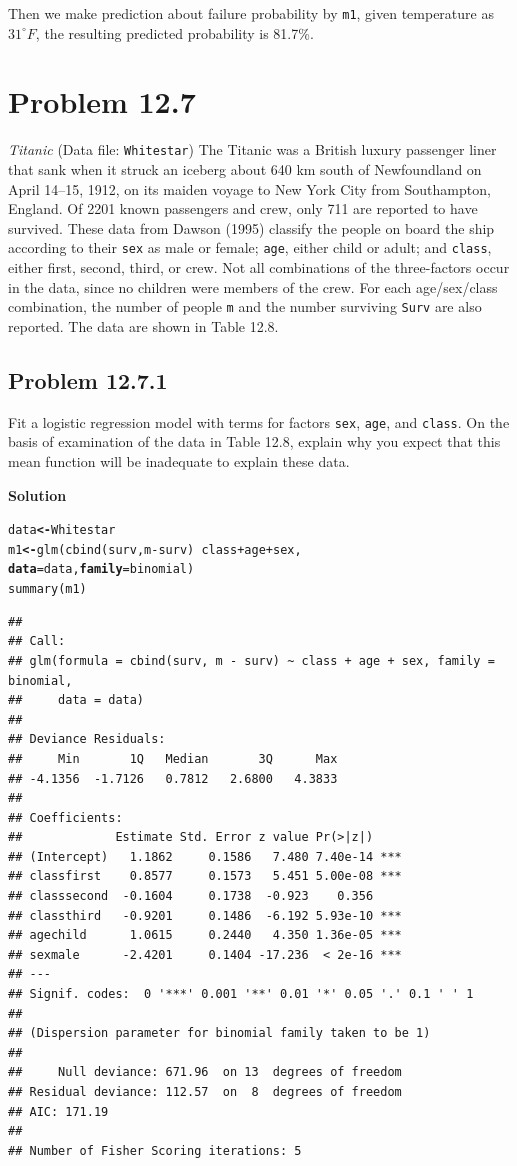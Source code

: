 \documentclass[12pt,oneside,a4paper]{article}\usepackage[]{graphicx}\usepackage[]{xcolor}
\makeatletter
\newcommand{\hlopt}[1]{\textcolor[rgb]{0,0,0}{#1}}%
\newcommand{\hlstd}[1]{\textcolor[rgb]{0,0,0}{#1}}%
\newcommand{\hlkwb}[1]{\textcolor[rgb]{0.498,0,0.333}{\textbf{#1}}}%
\newcommand{\hlkwc}[1]{\textcolor[rgb]{0.498,0,0.333}{\textbf{#1}}}%
\newcommand{\hlkwd}[1]{\textcolor[rgb]{0,0,0}{#1}}%
\newenvironment{kframe}{%
 \def\at@end@of@kframe{}%
 \ifinner\ifhmode%
  \def\at@end@of@kframe{\end{minipage}}%
  \begin{minipage}{\columnwidth}%
 \fi\fi%
 \def\FrameCommand##1{\hskip\@totalleftmargin \hskip-\fboxsep
 \colorbox{shadecolor}{##1}\hskip-\fboxsep
     \hskip-\linewidth \hskip-\@totalleftmargin \hskip\columnwidth}%
 \MakeFramed {\advance\hsize-\width
   \@totalleftmargin\z@ \linewidth\hsize
   \@setminipage}}%
 {\par\unskip\endMakeFramed%
 \at@end@of@kframe}
\newenvironment{knitrout}{}{} %
\newcommand{\problem}[1]
{
    \clearpage
    \section*{Problem {#1}}
}
\newcommand{\subproblem}[1]
{
    \subsection*{Problem {#1}}
}
\newcommand{\solution}
{
    \vspace{15pt}
    \noindent\ignorespaces\textbf{\large Solution}\par
}
\newcommand{\m}[1]{\texttt{{#1}}}
\makeatother
\begin{document}
Then we make prediction about failure probability by \m{m1}, given temperature as $31^{\circ}F$, the resulting predicted probability is 81.7\%.

\problem{12.7}
\emph{Titanic} (Data file: \m{Whitestar}) The Titanic was a British luxury passenger liner that sank when it struck an iceberg about 640 km south of Newfoundland on April 14–15, 1912, on its maiden voyage to New York City from Southampton, England. Of 2201 known passengers and crew, only 711 are reported to have survived. These data from Dawson (1995) classify the people on board the ship according to their \m{sex} as male or female; \m{age}, either child or adult; and \m{class}, either first, second, third, or crew. Not all combinations of the three-factors occur in the data, since no children were members of the crew. For each age/sex/class combination, the number of people \m{m} and the number surviving \m{Surv} are also reported. The data are shown in Table 12.8.

\subproblem{12.7.1}
Fit a logistic regression model with terms for factors \m{sex}, \m{age}, and \m{class}. On the basis of examination of the data in Table 12.8, explain why you expect that this mean function will be inadequate to explain these data.

\solution
\begin{knitrout}
\color{fgcolor}\begin{kframe}
\begin{alltt}
\hlstd{data} \hlkwb{<-} \hlstd{Whitestar}
\hlstd{m1} \hlkwb{<-} \hlkwd{glm}\hlstd{(}\hlkwd{cbind}\hlstd{(surv, m} \hlopt{-} \hlstd{surv)} \hlopt{~} \hlstd{class} \hlopt{+} \hlstd{age} \hlopt{+} \hlstd{sex,}
          \hlkwc{data} \hlstd{= data,} \hlkwc{family} \hlstd{= binomial)}
\hlkwd{summary}\hlstd{(m1)}
\end{alltt}
\begin{verbatim}
## 
## Call:
## glm(formula = cbind(surv, m - surv) ~ class + age + sex, family = binomial, 
##     data = data)
## 
## Deviance Residuals: 
##     Min       1Q   Median       3Q      Max  
## -4.1356  -1.7126   0.7812   2.6800   4.3833  
## 
## Coefficients:
##             Estimate Std. Error z value Pr(>|z|)    
## (Intercept)   1.1862     0.1586   7.480 7.40e-14 ***
## classfirst    0.8577     0.1573   5.451 5.00e-08 ***
## classsecond  -0.1604     0.1738  -0.923    0.356    
## classthird   -0.9201     0.1486  -6.192 5.93e-10 ***
## agechild      1.0615     0.2440   4.350 1.36e-05 ***
## sexmale      -2.4201     0.1404 -17.236  < 2e-16 ***
## ---
## Signif. codes:  0 '***' 0.001 '**' 0.01 '*' 0.05 '.' 0.1 ' ' 1
## 
## (Dispersion parameter for binomial family taken to be 1)
## 
##     Null deviance: 671.96  on 13  degrees of freedom
## Residual deviance: 112.57  on  8  degrees of freedom
## AIC: 171.19
## 
## Number of Fisher Scoring iterations: 5
\end{verbatim}
\end{kframe}
\end{knitrout}
\end{document}
